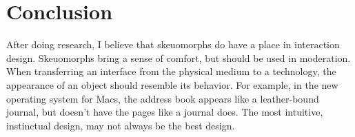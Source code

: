 \documentclass{article}
\begin{document}
\section{Conclusion}

	After doing research, I believe that skeuomorphs do have a place in interaction design. Skeuomorphs bring a sense of comfort, but should be used in moderation. When transferring an interface from the physical medium to a technology, the appearance of an object should resemble its behavior. For example, in the new operating system for Macs, the address book appears like a leather-bound journal, but doesn’t have the pages like a journal does. The most intuitive, instinctual design, may not always be the best design.
\pagebreak


\end{document}
